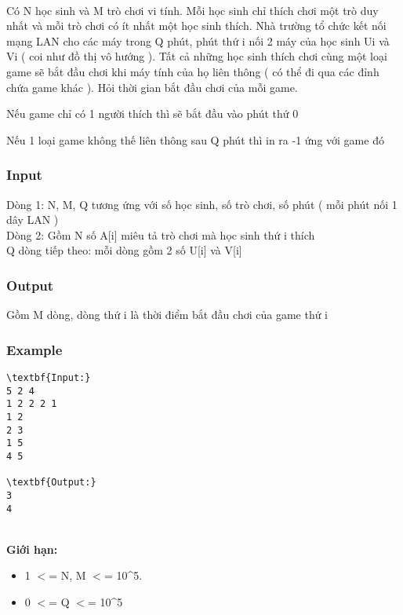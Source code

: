 

 

Có N học sinh và M trò chơi vi tính. Mỗi học sinh chỉ thích chơi một trò duy nhất và mỗi trò chơi có ít nhất một học sinh thích. Nhà trường tổ chức kết nối mạng LAN cho các máy trong Q phút, phút thứ i nối 2 máy của học sinh Ui và Vi ( coi như đồ thị vô hướng ). Tất cả những học sinh thích chơi cùng một loại game sẽ bắt đầu chơi khi máy tính của họ liên thông ( có thể đi qua các đỉnh chứa game khác ). Hỏi thời gian bắt đầu chơi của mỗi game.

Nếu game chỉ có 1 người thích thì sẽ bắt đầu vào phút thứ 0

Nếu 1 loại game không thế liên thông sau Q phút thì in ra -1 ứng với game đó

\subsubsection{Input}

Dòng 1: N, M, Q tương ứng với số học sinh, số trò chơi, số phút ( mỗi phút nối 1 dây LAN )
\\Dòng 2: Gồm N số A[i] miêu tả trò chơi mà học sinh thứ i thích
\\Q dòng tiếp theo: mỗi dòng gồm 2 số U[i] và V[i]

\subsubsection{Output}

Gồm M dòng, dòng thứ i là thời điểm bắt đầu chơi của game thứ i

\subsubsection{Example}
\begin{verbatim}
\textbf{Input:}
5 2 4
1 2 2 2 1
1 2
2 3
1 5
4 5

\textbf{Output:}
3
4\end{verbatim}
\\\textbf{Giới hạn:} 
\begin{itemize}
	\item 1 $<$= N, M $<$= 10\textasciicircum5.
	\item 0 $<$= Q $<$= 10\textasciicircum5
\end{itemize}